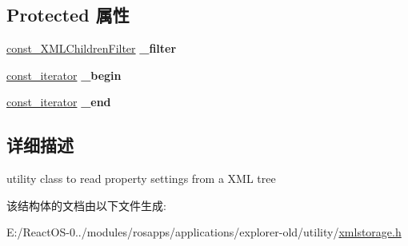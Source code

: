 \subsection*{Protected 属性}
\begin{DoxyCompactItemize}
\item 
\mbox{\label{struct_x_m_l_storage_1_1_x_m_l_property_reader_ac79e1c707a8996997dcfc9f3b119a5d4}} 
\hyperlink{struct_x_m_l_storage_1_1const___x_m_l_children_filter}{const\+\_\+\+X\+M\+L\+Children\+Filter} {\bfseries \+\_\+filter}
\item 
\mbox{\label{struct_x_m_l_storage_1_1_x_m_l_property_reader_a66f29670b93e277bd64cb01b5ae94c0a}} 
\hyperlink{struct_x_m_l_storage_1_1_x_m_l_property_reader_1_1const__iterator}{const\+\_\+iterator} {\bfseries \+\_\+begin}
\item 
\mbox{\label{struct_x_m_l_storage_1_1_x_m_l_property_reader_a24d81efd8748ad4371a25874d1422c6a}} 
\hyperlink{struct_x_m_l_storage_1_1_x_m_l_property_reader_1_1const__iterator}{const\+\_\+iterator} {\bfseries \+\_\+end}
\end{DoxyCompactItemize}


\subsection{详细描述}
utility class to read property settings from a X\+ML tree 

该结构体的文档由以下文件生成\+:\begin{DoxyCompactItemize}
\item 
E\+:/\+React\+O\+S-\/0../modules/rosapps/applications/explorer-\/old/utility/\hyperlink{xmlstorage_8h}{xmlstorage.\+h}\end{DoxyCompactItemize}
